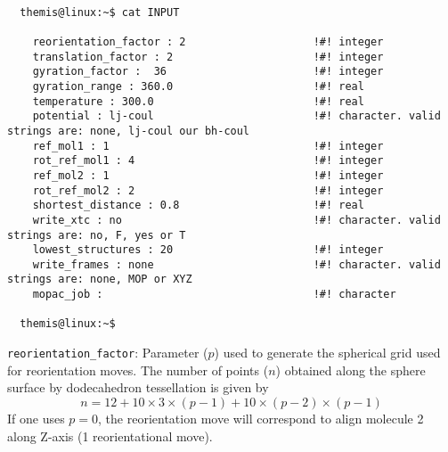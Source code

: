\documentclass{achemso}
\begin{document}
\begin{center}
  \begin{minipage}{0.95\textwidth}
    \vskip0.25cm
    \begin{verbatim}

  themis@linux:~$ cat INPUT 

    reorientation_factor : 2                    !#! integer
    translation_factor : 2                      !#! integer
    gyration_factor :  36                       !#! integer
    gyration_range : 360.0                      !#! real 
    temperature : 300.0                         !#! real
    potential : lj-coul                         !#! character. valid strings are: none, lj-coul our bh-coul
    ref_mol1 : 1                                !#! integer
    rot_ref_mol1 : 4                            !#! integer
    ref_mol2 : 1                                !#! integer
    rot_ref_mol2 : 2                            !#! integer
    shortest_distance : 0.8                     !#! real
    write_xtc : no                              !#! character. valid strings are: no, F, yes or T
    lowest_structures : 20                      !#! integer
    write_frames : none                         !#! character. valid strings are: none, MOP or XYZ
    mopac_job :                                 !#! character

  themis@linux:~$

    \end{verbatim}
  \end{minipage}%
\end{center}

\texttt{reorientation\_factor}: Parameter ($p$) used to generate the spherical 
  grid used for reorientation moves. The number of points ($n$) obtained along 
  the sphere surface by dodecahedron tessellation is given by
  $$ n = 12 + 10 \times 3 \times ( p - 1 ) + 10 \times ( p - 2 ) \times ( p - 1 ) $$
  If one uses $p = 0$, the reorientation move will correspond to align molecule 2 along 
  Z-axis (1 reorientational move). 
\end{document}
